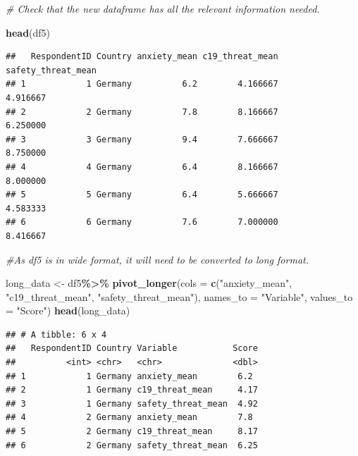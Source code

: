 \documentclass[
]{article}
\newenvironment{Shaded}{\begin{snugshade}}{\end{snugshade}}
\newcommand{\AttributeTok}[1]{\textcolor[rgb]{0.13,0.29,0.53}{#1}}
\newcommand{\CommentTok}[1]{\textcolor[rgb]{0.56,0.35,0.01}{\textit{#1}}}
\newcommand{\FunctionTok}[1]{\textcolor[rgb]{0.13,0.29,0.53}{\textbf{#1}}}
\newcommand{\NormalTok}[1]{#1}
\newcommand{\OtherTok}[1]{\textcolor[rgb]{0.56,0.35,0.01}{#1}}
\newcommand{\SpecialCharTok}[1]{\textcolor[rgb]{0.81,0.36,0.00}{\textbf{#1}}}
\newcommand{\StringTok}[1]{\textcolor[rgb]{0.31,0.60,0.02}{#1}}
\begin{document}
\begin{Shaded}
\begin{Highlighting}[]
\CommentTok{\# Check that the new dataframe has all the relevant information needed. }


\FunctionTok{head}\NormalTok{(df5)}
\end{Highlighting}
\end{Shaded}

\begin{verbatim}
##   RespondentID Country anxiety_mean c19_threat_mean safety_threat_mean
## 1            1 Germany          6.2        4.166667           4.916667
## 2            2 Germany          7.8        8.166667           6.250000
## 3            3 Germany          9.4        7.666667           8.750000
## 4            4 Germany          6.4        8.166667           8.000000
## 5            5 Germany          6.4        5.666667           4.583333
## 6            6 Germany          7.6        7.000000           8.416667
\end{verbatim}

\begin{Shaded}
\begin{Highlighting}[]
\CommentTok{\#As df5 is in wide format, it will need to be converted to long format. }

\NormalTok{long\_data }\OtherTok{\textless{}{-}}\NormalTok{ df5}\SpecialCharTok{\%\textgreater{}\%}
  \FunctionTok{pivot\_longer}\NormalTok{(}\AttributeTok{cols =} \FunctionTok{c}\NormalTok{(}\StringTok{"anxiety\_mean"}\NormalTok{, }\StringTok{"c19\_threat\_mean"}\NormalTok{, }\StringTok{"safety\_threat\_mean"}\NormalTok{), }
               \AttributeTok{names\_to =} \StringTok{"Variable"}\NormalTok{,}
               \AttributeTok{values\_to =} \StringTok{"Score"}\NormalTok{)}
\FunctionTok{head}\NormalTok{(long\_data)}
\end{Highlighting}
\end{Shaded}

\begin{verbatim}
## # A tibble: 6 x 4
##   RespondentID Country Variable           Score
##          <int> <chr>   <chr>              <dbl>
## 1            1 Germany anxiety_mean        6.2 
## 2            1 Germany c19_threat_mean     4.17
## 3            1 Germany safety_threat_mean  4.92
## 4            2 Germany anxiety_mean        7.8 
## 5            2 Germany c19_threat_mean     8.17
## 6            2 Germany safety_threat_mean  6.25
\end{verbatim}
\end{document}

